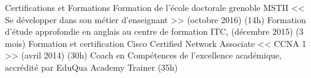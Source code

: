 \begin{rubric}{Certifications et Formations}
\entry*[]	 Formation de l'école doctorale grenoble MSTII << Se développer dans son métier d'enseignant >> (octobre 2016) (14h)	
\entry*[]	 Formation d'étude approfondie en anglais au centre de formation ITC, (décembre 2015) (3 mois) 
\entry*[]	 Formation et certification Cisco Certified Network Associate << CCNA 1 >> (avril 2014) (30h)
    \entry*[] Coach en Compétences de l'excellence académique, accrédité par EduQua Academy Trainer (35h)
\end{rubric}
